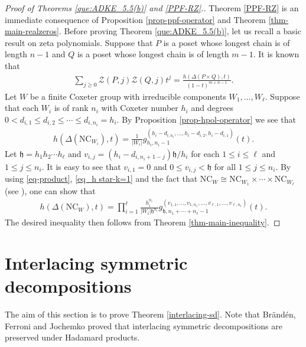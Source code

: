 \documentclass[12pt]{article}
\newcommand{\NC}{\mathrm{NC}}
\numberwithin{equation}{section}
\begin{document}
\begin{proof}[Proof of Theorems \ref{que:ADKE_5.5(b)} and \ref{PPF-RZ}.]
Theorem \ref{PPF-RZ} is an immediate consequence of Proposition \ref{prop-ppf-operator} and Theorem \ref{thm-main-realzeros}.
Before proving Theorem \ref{que:ADKE_5.5(b)}, let us recall a basic result on zeta polynomials.
Suppose that $P$ is a poset whose longest chain is of length $n-1$ and $Q$ is a poset whose longest chain is of length $m-1$.
It is known that   
\begin{align}\label{eq-product}
\sum_{j\ge 0}\mathcal{Z}(P,j)\mathcal{Z}(Q,j)t^j=\frac{h(\Delta(P\times Q),t)}{(1-t)^{m+n-1}}.
\end{align}
Let $W$ be a finite Coxeter group with irreducible components $W_1,\ldots,W_\ell$. Suppose that each $W_i$ is of rank $n_i$ with Coxeter number $h_i$ and degrees $0<d_{i,1}\le d_{i,2}\le \cdots \le d_{i,n_i}=h_i$.
By Proposition \ref{prop-hpol-operator} we see that 
\begin{align}\label{eq_h star-k=1}
h\left(\Delta\left(\NC_{W_i}\right),t\right)=\frac{1}{|W_i|}g^{(h_i-d_{i,n_i},\ldots,h_i-d_{i,2},h_i-d_{i,1})}_{h_i,n_i-1}(t).
\end{align}
Let $\mathfrak{h}=h_1h_2\cdots h_{\ell}$ and $v_{i,j}=(h_i-d_{i,n_i+1-j})\mathfrak{h}/h_i$ for each $1\leq i\leq \ell$ and $1\leq j\leq n_i$. It is easy to see that
$v_{i,1}=0$ and $0\leq v_{i,j}<\mathfrak{h}$ for all $1\leq j\leq n_i$. 
By using \eqref{eq-product}, \eqref{eq_h star-k=1} and the fact that $\NC_W\cong \NC_{W_1}\times \cdots\times \NC_{W_{\ell}}$ (see \cite[Section 3.4.3]{Armstrong-2009}), one can show that 
\begin{align}\label{eq_finite Coxeter}
h\left(\Delta\left(\NC_{W}\right),t\right)=\prod_{i=1}^{\ell}\frac{h_i^{n_i}}{|W_i|\mathfrak{h}^{n_i}}g^{(v_{1,1},\ldots,v_{1,n_1},\ldots,v_{\ell,1},\ldots,v_{\ell,n_{\ell}})}_{\mathfrak{h},n_1+\cdots+n_{\ell}-1}(t).   
\end{align}
The desired inequality then follows from Theorem \ref{thm-main-inequality}.  
\end{proof}

\section{Interlacing symmetric decompositions}\label{sec 5}

The aim of this section is to prove Theorem \ref{interlacing-sd}. Note that Br\"and\'en, Ferroni and Jochemko \cite{Branden-2024} proved that interlacing symmetric decompositions are preserved under Hadamard products. 
\end{document}
